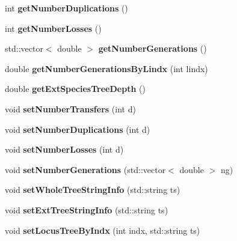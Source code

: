 \begin{DoxyCompactItemize}
int {\bfseries get\+Number\+Duplications} ()
\item 
\mbox{\label{class_tree_info_af4ba25d86eb43de749e519ee59579fc5}} 
int {\bfseries get\+Number\+Losses} ()
\item 
\mbox{\label{class_tree_info_a76973d8e4b91c51eac102a8b75b1240d}} 
std\+::vector$<$ double $>$ {\bfseries get\+Number\+Generations} ()
\item 
\mbox{\label{class_tree_info_abb6030f12d958662d2765469d8f4de56}} 
double {\bfseries get\+Number\+Generations\+By\+Lindx} (int lindx)
\item 
\mbox{\label{class_tree_info_a4557a099751e3c627cea0b0227e3b46a}} 
double {\bfseries get\+Ext\+Species\+Tree\+Depth} ()
\item 
\mbox{\label{class_tree_info_a3e5aca76f7e8da6dcc2415b12b539b2e}} 
void {\bfseries set\+Number\+Transfers} (int d)
\item 
\mbox{\label{class_tree_info_a448fee4bce56657e85b012fc194c6f38}} 
void {\bfseries set\+Number\+Duplications} (int d)
\item 
\mbox{\label{class_tree_info_a3e8727b034438ac04b86503f15393b0c}} 
void {\bfseries set\+Number\+Losses} (int d)
\item 
\mbox{\label{class_tree_info_adcb46ac88af15080e39adcd75c066e3c}} 
void {\bfseries set\+Number\+Generations} (std\+::vector$<$ double $>$ ng)
\item 
\mbox{\label{class_tree_info_a97f7138dc419c54c6774f6e7799081cb}} 
void {\bfseries set\+Whole\+Tree\+String\+Info} (std\+::string ts)
\item 
\mbox{\label{class_tree_info_ad8732cad13019a4eda73409d32d81301}} 
void {\bfseries set\+Ext\+Tree\+String\+Info} (std\+::string ts)
\item 
\mbox{\label{class_tree_info_a7d1959d8ae515a36441cfd47b6027170}} 
void {\bfseries set\+Locus\+Tree\+By\+Indx} (int indx, std\+::string ts)

\end{DoxyCompactItemize}
